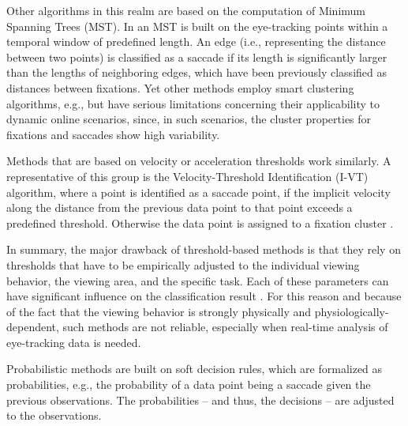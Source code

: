 \documentclass[preprint,12pt]{elsarticle}
\begin{document}
Other algorithms in this realm are based on the computation of Minimum Spanning Trees (MST).
In \cite{Salvucci:2000:IFS:355017.355028} an MST is built on the eye-tracking points within a temporal window of predefined length.
An edge (i.e., representing the distance between two points) is classified as a saccade if its length is significantly larger than the lengths of neighboring edges,
which have been previously classified as distances between fixations.
Yet other methods employ smart clustering algorithms, e.g., \cite{Santella:2004:RCE:968363.968368, Urruty:2007:DEF:1314303.1314308}
but have serious limitations concerning their applicability to dynamic online scenarios,
since, in such scenarios, the cluster properties for fixations and saccades show high variability.

Methods that are based on velocity or acceleration thresholds work similarly.
A representative of this group is the Velocity-Threshold Identification (I-VT) algorithm,
where a point is identified as a saccade point,
if the implicit velocity along the distance from the previous data point to that point exceeds a predefined threshold.
Otherwise the data point is assigned to a fixation cluster \cite{Salvucci:2000:IFS:355017.355028}.

In summary, the major drawback of threshold-based methods is that they rely on thresholds that have to be empirically adjusted to the individual viewing behavior,
the viewing area, and the specific task.
Each of these parameters can have significant influence on the classification result \cite{Komogortsev2013, Salvucci:2000:IFS:355017.355028}.
For this reason and because of the fact that the viewing behavior is strongly physically and physiologically-dependent, such methods are not reliable, especially when real-time analysis of eye-tracking data is needed.

Probabilistic methods are built on soft decision rules, which are formalized as probabilities, e.g.,  the probability of a data point being a saccade given the previous observations. The probabilities – and thus, the decisions – are adjusted to the observations.
\end{document}
